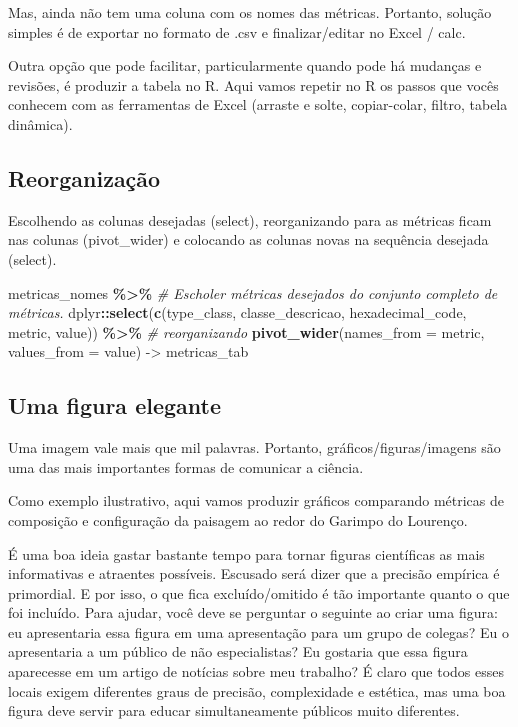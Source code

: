 \documentclass[
]{article}
\newenvironment{Shaded}{\begin{snugshade}}{\end{snugshade}}
\newcommand{\AttributeTok}[1]{\textcolor[rgb]{0.13,0.29,0.53}{#1}}
\newcommand{\CommentTok}[1]{\textcolor[rgb]{0.56,0.35,0.01}{\textit{#1}}}
\newcommand{\FunctionTok}[1]{\textcolor[rgb]{0.13,0.29,0.53}{\textbf{#1}}}
\newcommand{\NormalTok}[1]{#1}
\newcommand{\OtherTok}[1]{\textcolor[rgb]{0.56,0.35,0.01}{#1}}
\newcommand{\SpecialCharTok}[1]{\textcolor[rgb]{0.81,0.36,0.00}{\textbf{#1}}}
\begin{document}
Mas, ainda não tem uma coluna com os nomes das métricas.
Portanto, solução simples é de exportar no formato de .csv e
finalizar/editar no Excel / calc.

Outra opção que pode facilitar, particularmente quando pode há mudanças
e revisões, é produzir a tabela no R. Aqui vamos repetir no R os
passos que vocês conhecem com as ferramentas de Excel (arraste e solte,
copiar-colar, filtro, tabela dinâmica).

\hypertarget{reorganizauxe7uxe3o}{%
\subsection{Reorganização}\label{reorganizauxe7uxe3o}}

Escolhendo as colunas desejadas (select), reorganizando para as
métricas ficam nas colunas (pivot\_wider) e colocando as colunas novas na sequência desejada (select).

\begin{Shaded}
\begin{Highlighting}[]
\NormalTok{metricas\_nomes }\SpecialCharTok{\%\textgreater{}\%} 
\CommentTok{\# Escholer métricas desejados do conjunto completo de métricas.}
\NormalTok{dplyr}\SpecialCharTok{::}\FunctionTok{select}\NormalTok{(}\FunctionTok{c}\NormalTok{(type\_class, classe\_descricao, hexadecimal\_code, }
\NormalTok{metric, value)) }\SpecialCharTok{\%\textgreater{}\%} 
\CommentTok{\# reorganizando}
\FunctionTok{pivot\_wider}\NormalTok{(}\AttributeTok{names\_from =}\NormalTok{ metric, }\AttributeTok{values\_from =}\NormalTok{ value) }\OtherTok{{-}\textgreater{}}\NormalTok{ metricas\_tab}
\end{Highlighting}
\end{Shaded}

\newpage

\hypertarget{uma-figura-elegante}{%
\subsection{Uma figura elegante}\label{uma-figura-elegante}}

Uma imagem vale mais que mil palavras.
Portanto, gráficos/figuras/imagens são uma das mais importantes formas
de comunicar a ciência.

Como exemplo ilustrativo, aqui vamos produzir
gráficos comparando métricas de composição e configuração da paisagem
ao redor do Garimpo do Lourenço.

É uma boa ideia gastar bastante tempo para tornar figuras científicas
as mais informativas e atraentes possíveis. Escusado será dizer que a
precisão empírica é primordial. E por isso, o que fica excluído/omitido
é tão importante quanto o que foi incluído. Para ajudar, você deve se
perguntar o seguinte ao criar uma figura: eu apresentaria essa figura
em uma apresentação para um grupo de colegas? Eu o apresentaria a um
público de não especialistas? Eu gostaria que essa figura aparecesse
em um artigo de notícias sobre meu trabalho? É claro que todos esses
locais exigem diferentes graus de precisão, complexidade e estética,
mas uma boa figura deve servir para educar simultaneamente públicos
muito diferentes.
\end{document}
